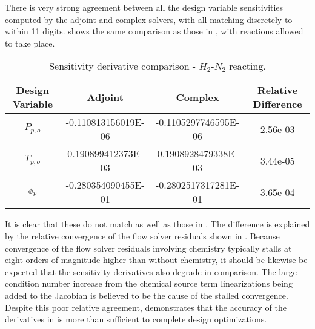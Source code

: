 There is very strong agreement between all the design variable sensitivities
computed by the adjoint and complex solvers, with all matching discretely to
within 11 digits.   shows the same comparison as
those in , with reactions allowed to take place.
\begin{table}[h]
  \centering
  \caption{Sensitivity derivative comparison - $H_2$-$N_2$ reacting.}
  \begin{tabular}{c|c|c|c}
    Design Variable & Adjoint & Complex & Relative Difference\\
    \hline
    $P_{p,o}$ & -0.110813156019E-06 & -0.1105297746595E-06 & 2.56e-03 \\
    $T_{p,o}$ &  0.190899412373E-03 &  0.1908928479338E-03 & 3.44e-05 \\
    $\phi_p$     & -0.280354090455E-01 & -0.2802517317281E-01 & 3.65e-04
  \end{tabular}
  \label{tab:react-deriv-check}
\end{table}
It is clear that these do not match as well as those in
.  The difference is explained
by the relative convergence of the flow solver residuals shown in
.  Because convergence of the flow solver residuals
involving chemistry typically stalls at eight orders of magnitude higher than
without chemistry, it should be likewise be expected that the sensitivity
derivatives also degrade in comparison.  The large condition number increase
from the chemical source term linearizations being added to the Jacobian is
believed to be the cause of the stalled convergence. Despite this poor relative
agreement,  demonstrates that the accuracy of
the derivatives in  is more than sufficient to
complete design optimizations.
